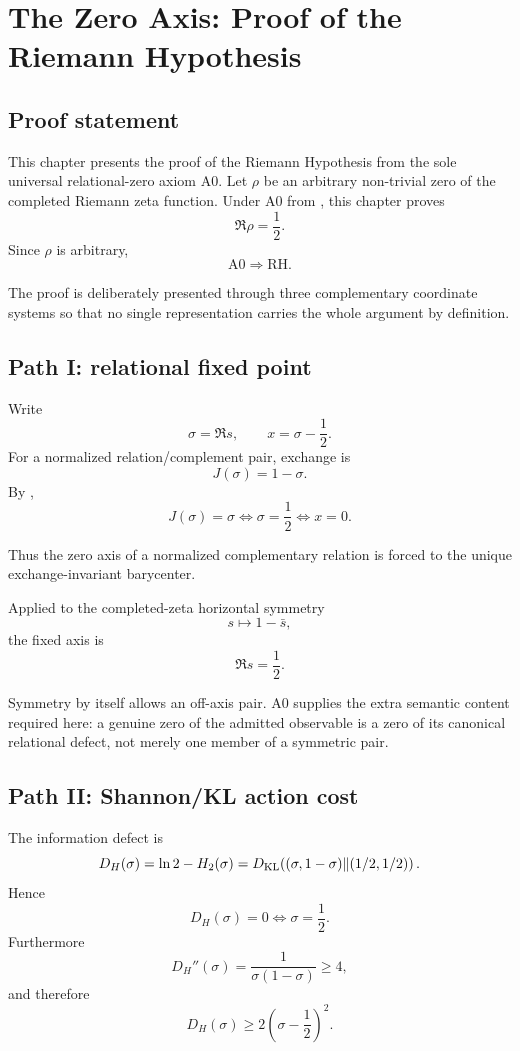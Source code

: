 \chapter{The Zero Axis: Proof of the Riemann Hypothesis}
\label{chap:zero-critical-relational-axis}

\section{Proof statement}

This chapter presents the proof of the Riemann Hypothesis from the sole universal relational-zero axiom A0. Let \(\rho\) be an arbitrary non-trivial zero of the completed Riemann zeta
function.  Under A0 from , this chapter proves
\[
\boxed{\Re\rho=\frac12.}
\]
Since \(\rho\) is arbitrary,
\[
\boxed{\mathrm{A0}\Longrightarrow\mathrm{RH}.}
\]

The proof is deliberately presented through three complementary coordinate
systems so that no single representation carries the whole argument by
definition.

\section{Path I: relational fixed point}

Write
\[
\sigma=\Re s,
\qquad
x=\sigma-\frac12.
\]
For a normalized relation/complement pair, exchange is
\[
J(\sigma)=1-\sigma.
\]
By ,
\[
J(\sigma)=\sigma
\iff
\sigma=\frac12
\iff
x=0.
\]

Thus the zero axis of a normalized complementary relation is forced to the
unique exchange-invariant barycenter.

Applied to the completed-zeta horizontal symmetry
\[
s\longmapsto1-\bar s,
\]
the fixed axis is
\[
\boxed{\Re s=\frac12.}
\]

Symmetry by itself allows an off-axis pair.  A0 supplies the extra semantic
content required here: a genuine zero of the admitted observable is a zero of
its canonical relational defect, not merely one member of a symmetric pair.

\section{Path II: Shannon/KL action cost}

The information defect is
\[
D_H(\sigma)
=
\ln2-H_2(\sigma)
=
D_{\rm KL}\!\left(
(\sigma,1-\sigma)
\middle\|
(1/2,1/2)
\right).
\]
Hence
\[
D_H(\sigma)=0
\iff
\sigma=\frac12.
\]
Furthermore
\[
D_H''(\sigma)=\frac1{\sigma(1-\sigma)}\ge4,
\]
and therefore
\[
\boxed{
D_H(\sigma)
\ge
2\left(\sigma-\frac12\right)^2.
}
\]

